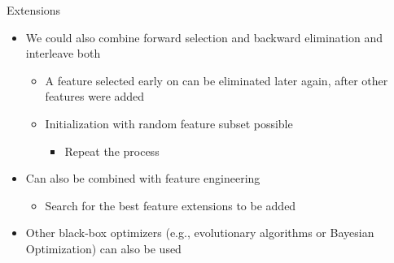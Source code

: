\documentclass[aspectratio=169]{../latex_main/tntbeamer}  %
\begin{document}
	\begin{frame}[c]{Extensions}

    \begin{itemize}
        \item We could also combine forward selection and backward elimination and interleave both 
        \begin{itemize}
            \item A feature selected early on can be eliminated later again, after other features were added
            \item Initialization with random feature subset possible
            \begin{itemize}
                \item Repeat the process
            \end{itemize}
        \end{itemize}
        \medskip
        \pause
        \item Can also be combined with feature engineering
        \begin{itemize}
            \item Search for the best feature extensions to be added
        \end{itemize}
        \medskip
        \pause
        \item Other black-box optimizers (e.g., evolutionary algorithms or Bayesian Optimization) can also be used
    \end{itemize}

	\end{frame}
	
\end{document}
